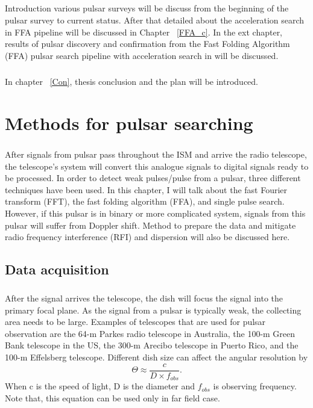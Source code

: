 \documentclass[thesis_msc.tex]{subfiles}
\begin{document}
    \paragraph{} Introduction various pulsar surveys will be discuss from the beginning of the pulsar survey to current status. After that detailed about the acceleration search in FFA pipeline will be discussed in Chapter ~\ref{FFA_c}. In the ext chapter, results of pulsar discovery and confirmation from the Fast Folding Algorithm (FFA) pulsar search pipeline with acceleration search in will be discussed. 
    \paragraph{} In chapter ~\ref{Con}, thesis conclusion and the plan will be introduced. 
    
\chapter{Methods for pulsar searching} \label{Methods}
\paragraph{} After signals from pulsar pass throughout the ISM and arrive the radio telescope, the telescope's system will convert this analogue signals to digital signals ready to be processed. In order to detect weak pulses/pulse from a pulsar, three different techniques have been used. In this chapter, I will talk about the fast Fourier transform (FFT), the fast folding algorithm (FFA), and single pulse search. However, if this pulsar is in binary or more complicated system, signals from this pulsar will suffer from Doppler shift.  Method to prepare the data and mitigate radio frequency interference (RFI) and dispersion will also be discussed here. 
    \section{Data acquisition}
		\paragraph{} After the signal arrives the telescope, the dish will focus the signal into the primary focal plane. As the signal from a pulsar is typically weak, the collecting area needs to be large. Examples of telescopes that are used for pulsar observation are the 64-m Parkes radio telescope in Australia, the 100-m Green Bank telescope in the US, the 300-m Arecibo telescope in Puerto Rico, and the 100-m Effelsberg telescope. Different dish size can affect the angular resolution by 
        \begin{equation} \label{angular_res}
        \Theta \approx \frac{c}{D \times f_{obs}}.
        \end{equation}
        When c is the speed of light, D is the diameter and $f_{obs}$ is observing frequency. Note that, this equation can be used only in far field case.
\end{document}
